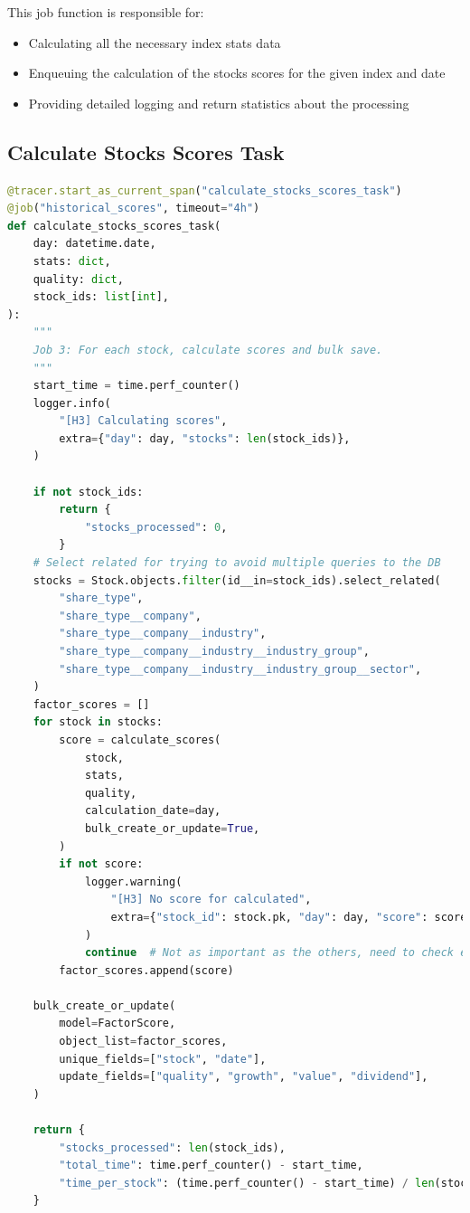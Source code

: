 \documentclass[11pt,english,a4paper,hidelinks]{book}
\begin{document}
\noindent This job function is responsible for:
\begin{itemize}
    \item Calculating all the necessary index stats data
    \item Enqueuing the calculation of the stocks scores for the given index and date
    \item Providing detailed logging and return statistics about the processing
\end{itemize}

\subsection{Calculate Stocks Scores Task}
\begin{lstlisting}[language=Python, caption=Calculate Stocks Scores Task, label={lst:calculate_stocks_scores_task}]
@tracer.start_as_current_span("calculate_stocks_scores_task")
@job("historical_scores", timeout="4h")
def calculate_stocks_scores_task(
    day: datetime.date,
    stats: dict,
    quality: dict,
    stock_ids: list[int],
):
    """
    Job 3: For each stock, calculate scores and bulk save.
    """
    start_time = time.perf_counter()
    logger.info(
        "[H3] Calculating scores",
        extra={"day": day, "stocks": len(stock_ids)},
    )

    if not stock_ids:
        return {
            "stocks_processed": 0,
        }
    # Select related for trying to avoid multiple queries to the DB
    stocks = Stock.objects.filter(id__in=stock_ids).select_related(
        "share_type",
        "share_type__company",
        "share_type__company__industry",
        "share_type__company__industry__industry_group",
        "share_type__company__industry__industry_group__sector",
    )
    factor_scores = []
    for stock in stocks:
        score = calculate_scores(
            stock,
            stats,
            quality,
            calculation_date=day,
            bulk_create_or_update=True,
        )
        if not score:
            logger.warning(
                "[H3] No score for calculated",
                extra={"stock_id": stock.pk, "day": day, "score": score},
            )
            continue  # Not as important as the others, need to check errors in DataDog
        factor_scores.append(score)

    bulk_create_or_update(
        model=FactorScore,
        object_list=factor_scores,
        unique_fields=["stock", "date"],
        update_fields=["quality", "growth", "value", "dividend"],
    )

    return {
        "stocks_processed": len(stock_ids),
        "total_time": time.perf_counter() - start_time,
        "time_per_stock": (time.perf_counter() - start_time) / len(stock_ids),
    }
    
\end{lstlisting}
\end{document}
